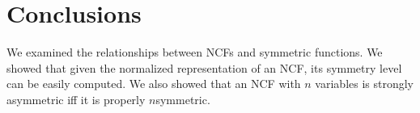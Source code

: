 \section{Conclusions}
\label{sec:concl}

We examined the relationships between NCFs and 
symmetric functions. 
We showed that given the normalized representation
of an NCF, its symmetry level can be easily computed.
We also showed that an NCF with $n$ variables is 
strongly asymmetric iff it is properly $n$symmetric. 
